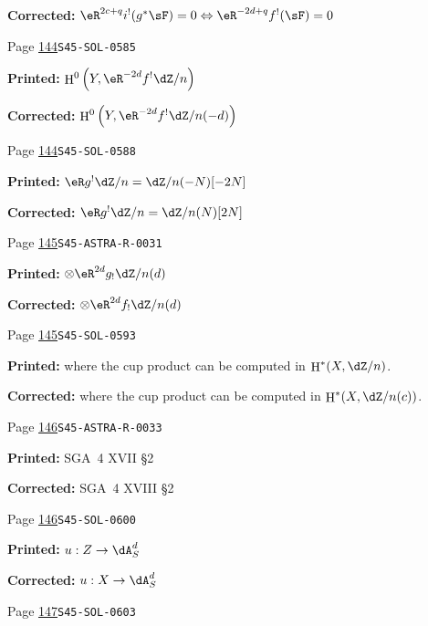 \documentclass[oneside]{book}
\makeatletter
\DeclareMathOperator{\h}{H}
\theoremstyle{sga-source}
\theoremstyle{sga-source-dash}
\theoremstyle{sga-source-dotdash}
\theoremstyle{sga-source-number-note-dash}
\theoremstyle{sga-source-note-number-dotdash}
\theoremstyle{sga-source-example-dotdash}
\theoremstyle{sga-source-inline-number}
\theoremstyle{sga-source-bare-number}
\theoremstyle{sga-source}
\newcommand{\EditionRememberCite}[2][]{%
  \if@filesw\immediate\write\@auxout{\string\citation{#2}}\fi}
\DeclareRobustCommand{\PrintCite}[2]{%
  \begingroup\let\cite\EditionRememberCite
    \setbox\z@=\hbox{#2}%
  \endgroup#1}
\def\PrintCite#1#2{#1}%
\makeatother
\begin{document}
\begin{description}
\par\noindent\textbf{Corrected:} \(\eR^{2 c+q} i^!(g^*\sF)=0\Leftrightarrow \eR^{-2 d+q}f^!(\sF)=0\)
\smallskip
\item[\hypertarget{apparatus:EN-0070}{70}] Page \hyperlink{printpage:en:144}{144}\quad\texttt{S45-SOL-0585}
\par\noindent\textbf{Printed:} \(\h^0\left(Y,\eR^{-2 d}f^!\dZ/n\right)\)
\par\noindent\textbf{Corrected:} \(\h^0\left(Y,\eR^{-2 d}f^!\dZ/n(-d)\right)\)
\smallskip
\item[\hypertarget{apparatus:EN-0071}{71}] Page \hyperlink{printpage:en:144}{144}\quad\texttt{S45-SOL-0588}
\par\noindent\textbf{Printed:} \(\eR g^! \dZ/n=\dZ/n(-N)[-2 N]\)
\par\noindent\textbf{Corrected:} \(\eR g^! \dZ/n=\dZ/n(N)[2 N]\)
\smallskip
\item[\hypertarget{apparatus:EN-0072}{72}] Page \hyperlink{printpage:en:145}{145}\quad\texttt{S45-ASTRA-R-0031}
\par\noindent\textbf{Printed:} \(\otimes \eR^{2 d} g_!\dZ/n(d)\)
\par\noindent\textbf{Corrected:} \(\otimes \eR^{2 d} f_!\dZ/n(d)\)
\smallskip
\item[\hypertarget{apparatus:EN-0073}{73}] Page \hyperlink{printpage:en:145}{145}\quad\texttt{S45-SOL-0593}
\par\noindent\textbf{Printed:} where the cup product can be computed in $\h^*(X,\dZ/n)$.
\par\noindent\textbf{Corrected:} where the cup product can be computed in $\h^*(X,\dZ/n(c))$.
\smallskip
\item[\hypertarget{apparatus:EN-0074}{74}] Page \hyperlink{printpage:en:146}{146}\quad\texttt{S45-ASTRA-R-0033}
\par\noindent\textbf{Printed:} \PrintCite{SGA~4 XVII \S2}{\cite[XVII \S2]{sga4}}
\par\noindent\textbf{Corrected:} \PrintCite{SGA~4 XVIII \S2}{\cite[XVIII \S2]{sga4}}
\smallskip
\item[\hypertarget{apparatus:EN-0075}{75}] Page \hyperlink{printpage:en:146}{146}\quad\texttt{S45-SOL-0600}
\par\noindent\textbf{Printed:} \(u:Z\to \dA_S^d\)
\par\noindent\textbf{Corrected:} \(u:X\to \dA_S^d\)
\smallskip
\item[\hypertarget{apparatus:EN-0076}{76}] Page \hyperlink{printpage:en:147}{147}\quad\texttt{S45-SOL-0603}

\end{description}
\end{document}
